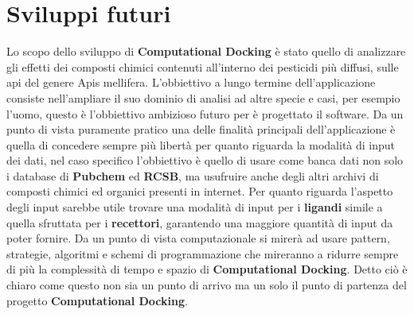 \section{Sviluppi futuri}
Lo scopo dello sviluppo di \textbf{Computational Docking} è stato quello di analizzare gli effetti dei composti chimici contenuti all'interno dei pesticidi più diffusi, sulle api del genere Apis mellifera. L'obbiettivo a lungo termine dell'applicazione consiste nell'ampliare il suo dominio di analisi ad altre specie e casi, per esempio l'uomo, questo è l'obbiettivo ambizioso futuro per è progettato il software.\newline
Da un punto di vista puramente pratico una delle finalità principali dell'applicazione è quella di concedere sempre più libertà per quanto riguarda la modalità di input dei dati, nel caso specifico l'obbiettivo è quello di usare come banca dati non solo i database di \textbf{Pubchem} ed \textbf{RCSB}, ma usufruire anche degli altri archivi di composti chimici ed organici presenti in internet. Per quanto riguarda l'aspetto degli input sarebbe utile trovare una modalità di input per i \textbf{ligandi} simile a quella sfruttata per i \textbf{recettori}, garantendo una maggiore quantità di input da poter fornire.\newline
Da un punto di vista computazionale si mirerà ad usare pattern, strategie, algoritmi e schemi di programmazione che mireranno a ridurre sempre di più la complessità di tempo e spazio di \textbf{Computational Docking}.\newline
Detto ciò è chiaro come questo non sia un punto di arrivo ma un solo il punto di partenza del progetto \textbf{Computational Docking}.